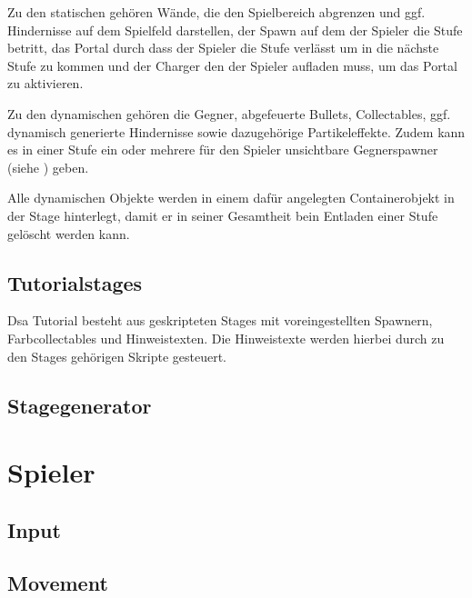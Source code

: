 \documentclass[a4paper,10pt,ngerman,fontsize=12pt]{scrreprt}
\begin{document}
Zu den statischen gehören Wände, die den Spielbereich abgrenzen und ggf. Hindernisse auf dem Spielfeld darstellen, der Spawn auf dem der Spieler die Stufe betritt, das Portal durch dass der Spieler die Stufe verlässt um in die nächste Stufe zu kommen und der Charger den der Spieler aufladen muss, um das Portal zu aktivieren.

Zu den dynamischen gehören die Gegner, abgefeuerte Bullets, Collectables, ggf. dynamisch generierte Hindernisse sowie dazugehörige Partikeleffekte. Zudem kann es in einer Stufe ein oder mehrere für den Spieler unsichtbare Gegnerspawner (siehe ) geben.

Alle dynamischen Objekte werden in einem dafür angelegten Containerobjekt in der Stage hinterlegt, damit er in seiner Gesamtheit bein Entladen einer Stufe gelöscht werden kann.



\subsection{Tutorialstages}

Dsa Tutorial besteht aus geskripteten Stages mit voreingestellten Spawnern, Farbcollectables und Hinweistexten. Die Hinweistexte werden hierbei durch zu den Stages gehörigen Skripte gesteuert.



\subsection{Stagegenerator}

\lipsum[3]



\section{Spieler}

\lipsum[3]



\subsection{Input}

\lipsum[3]


\subsection{Movement}

\lipsum[3]
\end{document}
